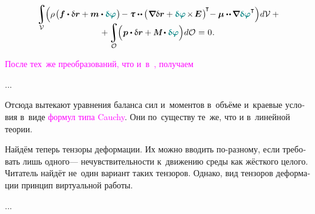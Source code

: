 \begin{otherlanguage}{russian}
\nopagebreak\vspace{-0.3em}\begin{multline}
\integral\displaylimits_{\mathcal{V}} \hspace{-0.64ex}
\left(^{\mathstrut} \hspace{-0.1ex}
\rho \hspace{.2ex} \bigl(
\bm{f} \dotp \variation{\currentvector}
+ \bm{m} \dotp \littlerotationvector
\hspace{.1ex} \bigr) \hspace{-0.2ex}
- \forcestresstensor \dotdotp \hspace{-0.1ex} \bigl( \hspace{.16ex} \boldnabla \variation{\currentvector} + \littlerotationvector \hspace{-0.2ex} \times \hspace{-0.25ex} \bm{E} \hspace{.2ex} \bigr)^{\hspace{-0.25ex}\T} \hspace{-0.5ex}
- \couplestresstensor \dotdotp \hspace{-0.16ex} \boldnabla \littlerotationvector^{\T}
\right) \hspace{-0.3ex} d\mathcal{V}
\hspace{.5ex} + \\[-1.2em]
%
+ \integral\displaylimits_{\mathcal{O}} \hspace{-0.64ex}
\left(^{\mathstrut}
\bm{p} \dotp \variation{\currentvector}
+ \mathboldM \hspace{-0.1ex} \dotp \littlerotationvector
\right) \hspace{-0.3ex} d\mathcal{O} \hspace{.1ex}
= \hspace{.1ex} 0 \hspace{.1ex} .
\end{multline}

\textcolor{magenta}{После тех~же преобразований, что и~в~, получаем}

...

Отсюда вытекают уравнения баланса сил и~моментов в~объёме и~краевые условия в~виде \textcolor{magenta}{формул типа Cauchy}. Они по~существу те~же, что и в~линейной теории.

Найдём теперь тензоры деформации. Их можно вводить по\hbox{-}разному, если требовать лишь одного\:--- нечувствительности к~движению среды как жёсткого целого. Читатель найдёт не~один вариант таких тензоров. Однако, вид тензоров деформации  принцип виртуальной работы.

...



\end{otherlanguage}

